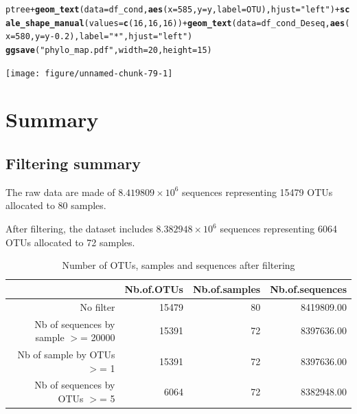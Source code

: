 \documentclass[12pt]{article}\usepackage[]{graphicx}\usepackage[]{color}
\makeatletter
\newcommand{\hlnum}[1]{\textcolor[rgb]{0.686,0.059,0.569}{#1}}%
\newcommand{\hlstr}[1]{\textcolor[rgb]{0.192,0.494,0.8}{#1}}%
\newcommand{\hlopt}[1]{\textcolor[rgb]{0,0,0}{#1}}%
\newcommand{\hlstd}[1]{\textcolor[rgb]{0.345,0.345,0.345}{#1}}%
\newcommand{\hlkwc}[1]{\textcolor[rgb]{0.333,0.667,0.333}{#1}}%
\newcommand{\hlkwd}[1]{\textcolor[rgb]{0.737,0.353,0.396}{\textbf{#1}}}%
\newenvironment{kframe}{%
 \def\at@end@of@kframe{}%
 \ifinner\ifhmode%
  \def\at@end@of@kframe{\end{minipage}}%
  \begin{minipage}{\columnwidth}%
 \fi\fi%
 \def\FrameCommand##1{\hskip\@totalleftmargin \hskip-\fboxsep
 \colorbox{shadecolor}{##1}\hskip-\fboxsep
     \hskip-\linewidth \hskip-\@totalleftmargin \hskip\columnwidth}%
 \MakeFramed {\advance\hsize-\width
   \@totalleftmargin\z@ \linewidth\hsize
   \@setminipage}}%
 {\par\unskip\endMakeFramed%
 \at@end@of@kframe}
\newenvironment{knitrout}{}{} %
\numberwithin{figure}{section}
\makeatother
\begin{document}
\begin{knitrout}\small
{}\color{fgcolor}\begin{kframe}
\begin{alltt}
\hlstd{ptree} \hlopt{+} \hlkwd{geom_text}\hlstd{(}\hlkwc{data} \hlstd{= df_cond,} \hlkwd{aes}\hlstd{(}\hlkwc{x} \hlstd{=} \hlnum{585}\hlstd{,} \hlkwc{y} \hlstd{= y,} \hlkwc{label} \hlstd{= OTU),} \hlkwc{hjust} \hlstd{=} \hlstr{"left"}\hlstd{)} \hlopt{+} \hlkwd{scale_shape_manual}\hlstd{(}\hlkwc{values} \hlstd{=} \hlkwd{c}\hlstd{(}\hlnum{16}\hlstd{,} \hlnum{16}\hlstd{,} \hlnum{16}\hlstd{))} \hlopt{+} \hlkwd{geom_text}\hlstd{(}\hlkwc{data} \hlstd{= df_cond_Deseq,} \hlkwd{aes}\hlstd{(}\hlkwc{x} \hlstd{=} \hlnum{580}\hlstd{,} \hlkwc{y} \hlstd{= y}\hlopt{-}\hlnum{0.2}\hlstd{),} \hlkwc{label} \hlstd{=} \hlstr{"*"}\hlstd{,} \hlkwc{hjust} \hlstd{=} \hlstr{"left"}\hlstd{)}
\hlkwd{ggsave}\hlstd{(}\hlstr{"phylo_map.pdf"}\hlstd{,}  \hlkwc{width} \hlstd{=} \hlnum{20}\hlstd{,} \hlkwc{height} \hlstd{=} \hlnum{15}\hlstd{)}
\end{alltt}
\end{kframe}

{\centering \texttt{[image: figure/unnamed-chunk-79-1]} 

}



\end{knitrout}



\section{Summary}
\label{sect:summary}

  \subsection{Filtering summary}

The raw data are made of \ensuremath{8.419809\times 10^{6}} sequences representing 15479 OTUs allocated to 80 samples.

After filtering, the dataset includes \ensuremath{8.382948\times 10^{6}} sequences representing 6064 OTUs allocated to 72 samples.

\begin{table}[ht]
\centering
\begin{tabular}{rrrr}
  \hline
 & Nb.of.OTUs & Nb.of.samples & Nb.of.sequences \\ 
  \hline
No filter & 15479 &  80 & 8419809.00 \\ 
  Nb of sequences by sample $>$=  20000 & 15391 &  72 & 8397636.00 \\ 
  Nb of sample by OTUs $>$=  1 & 15391 &  72 & 8397636.00 \\ 
  Nb of sequences by OTUs $>$=  5 & 6064 &  72 & 8382948.00 \\ 
   \hline
\end{tabular}
\caption{Number of OTUs, samples and sequences after filtering} 
\end{table}
\end{document}
